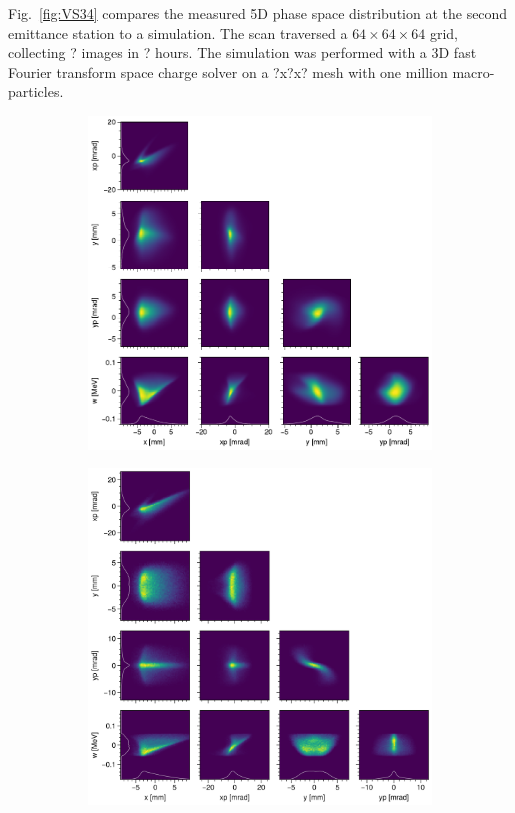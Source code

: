 \documentclass[letterpaper,
               keeplastbox,
               nospread,
               biblatex,
              ]{jacow}
\begin{document}
Fig.~\ref{fig:VS34} compares the measured 5D phase space distribution at the second emittance station to a simulation. The scan traversed a $64 \times 64 \times 64$ grid, collecting ? images in ? hours. The simulation was performed with a 3D fast Fourier transform space charge solver on a ?x?x? mesh with one million macro-particles.
%
\begin{figure}[!t]
    \centering
    \begin{subfigure}{0.48\textwidth}
        \includegraphics[width=\textwidth]{VS34_corner.pdf}
        \caption{}
        \label{fig:VS34_a}
    \end{subfigure}
    \hfill
    \hspace{0.1cm}
    \hfill
    \begin{subfigure}{0.48\textwidth}
        \includegraphics[width=\textwidth]{VS34_corner_sim.png}

\end{subfigure}
\end{figure}
\end{document}
